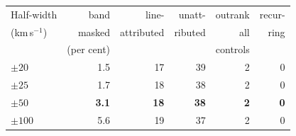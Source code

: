 \begin{tabular}{@{}lrrrrr@{}}
\hline
Half-width & band & line- & unatt- & outrank & recur- \\
(km\,s$^{-1}$) & masked & attributed & ributed & all & ring \\
 & (per cent) & & & controls & \\
\hline
$\pm20$ & 1.5 & 17 & 39 & 2 & 0 \\
$\pm25$ & 1.7 & 18 & 38 & 2 & 0 \\
\textbf{$\pm50$} & \textbf{3.1} & \textbf{18} & \textbf{38} & \textbf{2} & \textbf{0} \\
$\pm100$ & 5.6 & 19 & 37 & 2 & 0 \\
\hline
\end{tabular}
